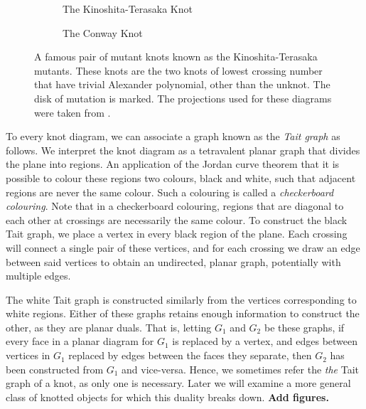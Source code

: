\documentclass[12pt]{report}
\newcommand{\notered}[1]{{\color{Red} \textbf{#1}}}
\begin{document}
\begin{figure}[hbt!]
	\centering
	\hspace*{\fill}
	\begin{subfigure}[b]{0.4 \textwidth}
		\centering
		\def\svgscale{0.25}
		
		\caption{The Kinoshita-Terasaka Knot}
		\label{fig:kinoshita-terasaka-knot}
	\end{subfigure}
	\hspace*{\fill} \hspace*{\fill}	\hspace*{\fill}
	\begin{subfigure}[b]{0.4 \textwidth}
		\centering
		\def\svgscale{0.25}
		
		\caption{The Conway Knot}
		\label{fig:conway-knot}
	\end{subfigure}
	\hspace*{\fill} 
	\caption{A famous pair of mutant knots known as the Kinoshita-Terasaka mutants. These knots are the two knots of lowest crossing number that have trivial Alexander polynomial, other than the unknot. The disk of mutation is marked. The projections used for these diagrams were taken from \cite{the-knot-book}.}
	\label{fig:kinoshita-terasaka-mutants}
\end{figure}

To every knot diagram, we can associate a graph known as the \textit{Tait graph} as follows. We interpret the knot diagram as a tetravalent planar graph that divides the plane into regions. An application of the Jordan curve theorem that it is possible to colour these regions two colours, black and white, such that adjacent regions are never the same colour. Such a colouring is called a \textit{checkerboard colouring}. Note that in a checkerboard colouring, regions that are diagonal to each other at crossings are necessarily the same colour. To construct the black Tait graph, we place a vertex in every black region of the plane. Each crossing will connect a single pair of these vertices, and for each crossing we draw an edge between said vertices to obtain an undirected, planar graph, potentially with multiple edges.

The white Tait graph is constructed similarly from the vertices corresponding to white regions. Either of these graphs retains enough information to construct the other, as they are planar duals. That is, letting $G_{1}$ and $G_{2}$ be these graphs, if every face in a planar diagram for $G_{1}$ is replaced by a vertex, and edges between vertices in $G_{1}$ replaced by edges between the faces they separate, then $G_{2}$ has been constructed from $G_{1}$ and vice-versa. Hence, we sometimes refer the \textit{the} Tait graph of a knot, as only one is necessary. Later we will examine a more general class of knotted objects for which this duality breaks down. \notered{Add figures.}
\end{document}
